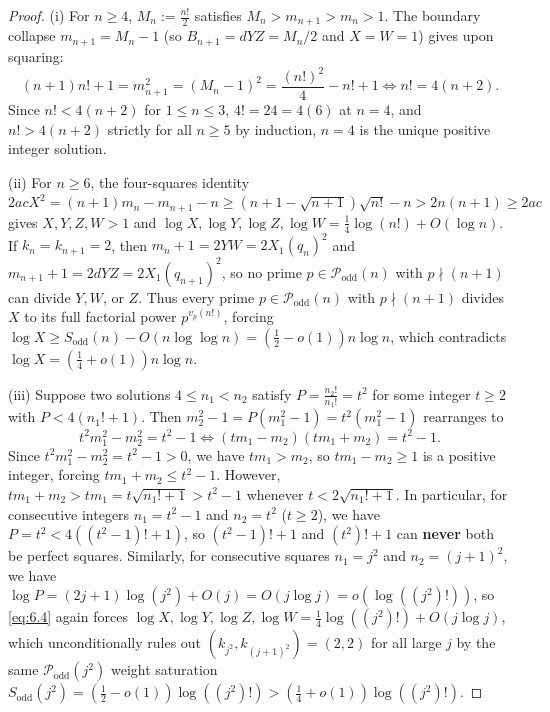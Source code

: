 \documentclass[11pt,reqno]{amsart}
\theoremstyle{remark}
\numberwithin{equation}{section}
\newcommand{\Podd}{\mathcal{P}_{\mathrm{odd}}}
\newcommand{\Sodd}{S_{\mathrm{odd}}}
\begin{document}
\begin{proof}
(i) For $n \ge 4$, $M_n := \frac{n!}{2}$ satisfies $M_n > m_{n+1} > m_n > 1$. The boundary collapse $m_{n+1} = M_n - 1$ (so $B_{n+1} = dYZ = M_n/2$ and $X = W = 1$) gives upon squaring:
\[
(n + 1)n! + 1 = m_{n+1}^2 = (M_n - 1)^2 = \frac{(n!)^2}{4} - n! + 1 \iff n! = 4(n + 2).
\]
Since $n! < 4(n + 2)$ for $1 \le n \le 3$, $4! = 24 = 4(6)$ at $n = 4$, and $n! > 4(n + 2)$ strictly for all $n \ge 5$ by induction, $n = 4$ is the unique positive integer solution.

(ii) For $n \ge 6$, the four-squares identity $2acX^2 = (n + 1)m_n - m_{n+1} - n \ge (n + 1 - \sqrt{n + 1})\sqrt{n!} - n > 2n(n + 1) \ge 2ac$ gives $X, Y, Z, W > 1$ and $\log X, \log Y, \log Z, \log W = \frac{1}{4}\log(n!) + O(\log n)$. If $k_n = k_{n+1} = 2$, then $m_n + 1 = 2YW = 2X_1(q_n)^2$ and $m_{n+1} + 1 = 2dYZ = 2X_1(q_{n+1})^2$, so no prime $p \in \Podd(n)$ with $p \nmid (n + 1)$ can divide $Y, W$, or $Z$. Thus every prime $p \in \Podd(n)$ with $p \nmid (n + 1)$ divides $X$ to its full factorial power $p^{v_p(n!)}$, forcing $\log X \ge \Sodd(n) - O(n\log\log n) = (\frac{1}{2} - o(1))n\log n$, which contradicts $\log X = (\frac{1}{4} + o(1))n\log n$.

(iii) Suppose two solutions $4 \le n_1 < n_2$ satisfy $P = \frac{n_2!}{n_1!} = t^2$ for some integer $t \ge 2$ with $P < 4(n_1! + 1)$. Then $m_2^2 - 1 = P(m_1^2 - 1) = t^2(m_1^2 - 1)$ rearranges to
\[
t^2 m_1^2 - m_2^2 = t^2 - 1 \iff (tm_1 - m_2)(tm_1 + m_2) = t^2 - 1.
\]
Since $t^2 m_1^2 - m_2^2 = t^2 - 1 > 0$, we have $tm_1 > m_2$, so $tm_1 - m_2 \ge 1$ is a positive integer, forcing $tm_1 + m_2 \le t^2 - 1$. However, $tm_1 + m_2 > tm_1 = t\sqrt{n_1! + 1} > t^2 - 1$ whenever $t < 2\sqrt{n_1! + 1}$. In particular, for consecutive integers $n_1 = t^2 - 1$ and $n_2 = t^2$ ($t \ge 2$), we have $P = t^2 < 4((t^2 - 1)! + 1)$, so $(t^2 - 1)! + 1$ and $(t^2)! + 1$ can \textbf{never} both be perfect squares. Similarly, for consecutive squares $n_1 = j^2$ and $n_2 = (j + 1)^2$, we have $\log P = (2j + 1)\log(j^2) + O(j) = O(j\log j) = o(\log((j^2)!))$, so \eqref{eq:6.4} again forces $\log X, \log Y, \log Z, \log W = \frac{1}{4}\log((j^2)!) + O(j\log j)$, which unconditionally rules out $(k_{j^2}, k_{(j+1)^2}) = (2, 2)$ for all large $j$ by the same $\Podd(j^2)$ weight saturation $\Sodd(j^2) = (\frac{1}{2} - o(1))\log((j^2)!) > (\frac{1}{4} + o(1))\log((j^2)!)$.
\end{proof}
\end{document}
